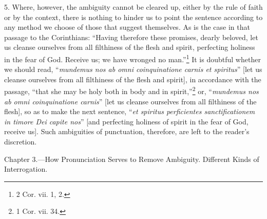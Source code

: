 5. Where, however, the ambiguity cannot be cleared up, either by the rule of faith or by the context, there is nothing to hinder us to point the sentence according to any method we choose of those that suggest themselves. As is the case in that passage to the Corinthians: “Having therefore these promises, dearly beloved, let us cleanse ourselves from all filthiness of the flesh and spirit, perfecting holiness in the fear of God. Receive us; we have wronged no man.”\footnote{2 Cor. vii. 1, 2.} It is doubtful whether we should read, “\emph{mundemus nos ab omni coinquinatione carnis et spiritus}” [let us cleanse ourselves from all filthiness of the flesh and spirit], in accordance with the passage, “that she may be holy both in body and in spirit,”\footnote{1 Cor. vii. 34.} or, “\emph{mundemus nos ab omni coinquinatione carnis}” [let us cleanse ourselves from all filthiness of the flesh], so as to make the next sentence, “\emph{et spiritus perficientes sanctificationem in timore Dei capite nos}” [and perfecting holiness of spirit in the fear of God, receive us]. Such ambiguities of punctuation, therefore, are left to the reader’s discretion.


Chapter 3.—How Pronunciation Serves to Remove Ambiguity. Different Kinds of Interrogation.

